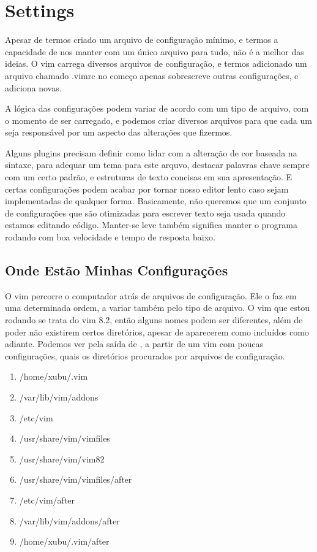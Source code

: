 \chapter{Settings}
Apesar de termos criado um arquivo de configuração mínimo,
e termos a capacidade de nos manter com um único arquivo para tudo, não é a melhor das ideias.
O vim carrega diversos arquivos de configuração, e termos adicionado um arquivo chamado .vimrc no começo apenas
sobrescreve outras configurações, e adiciona novas.

A lógica das configurações podem variar de acordo com um tipo de arquivo,
com o momento de ser carregado, e podemos criar diversos arquivos para que cada
um seja responsável por um aspecto das alterações que fizermos.

Alguns plugins precisam definir como lidar com a alteração de cor baseada na sintaxe,
para adequar um tema para este arquvo, destacar palavras chave sempre com um certo padrão,
e estruturas de texto concisas em sua apresentação.
E certas configurações podem acabar por tornar nosso editor lento caso sejam implementadas de qualquer forma.
Basicamente, não queremos que um conjunto de configurações que são otimizadas para escrever texto seja usada 
quando estamos editando código.
Manter-se leve também significa manter o programa rodando com boa velocidade e tempo de resposta baixo.

\section{Onde Estão Minhas Configurações}
O vim percorre o computador atrás de arquivos de configuração.
Ele o faz em uma determinada ordem, a variar também pelo tipo de arquivo.
O vim que estou rodando se trata do vim 8.2, então alguns nomes podem ser diferentes,
além de poder não existirem certos diretórios, apesar de aparecerem como incluídos como adiante.
Podemos ver pela saída de , a partir de um vim com poucas configurações,
quais os diretórios procurados por arquivos de configuração.
\begin{multicols}{2}
\begin{enumerate}
	\item /home/xubu/.vim
	\item /var/lib/vim/addons
	\item /etc/vim
	\item /usr/share/vim/vimfiles
	\item /usr/share/vim/vim82
	\item /usr/share/vim/vimfiles/after
	\item /etc/vim/after
	\item /var/lib/vim/addons/after
	\item /home/xubu/.vim/after
\end{enumerate}
\end{multicols}

